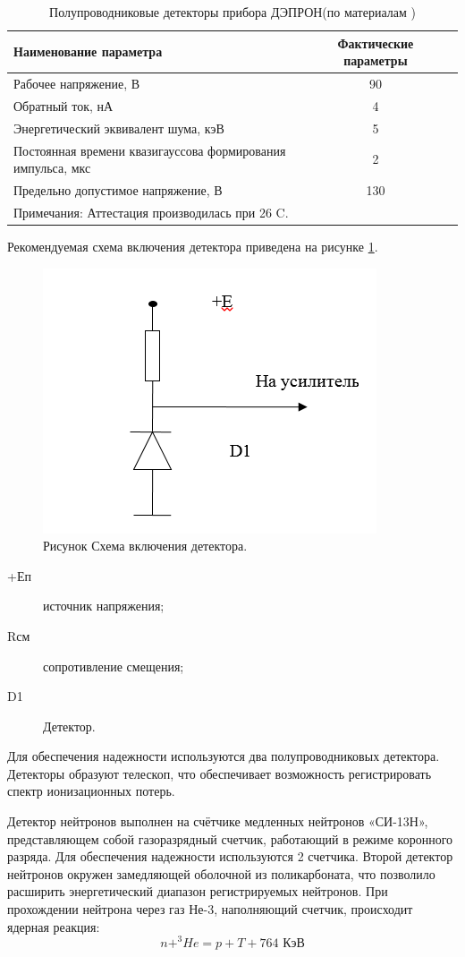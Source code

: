 \begin{table} 

	\begin{tabular}{p{10cm}|cc}
		Наименование параметра&Фактические параметры\\ \hline
		Рабочее напряжение, В&90&\\ Обратный ток, нА&4\\
		Энергетический эквивалент шума, кэВ&5\\
		Постоянная времени квазигауссова формирования импульса, мкс&2\\
		Предельно допустимое напряжение, В&130\\
		\multicolumn{2}{l}{Примечания: Аттестация производилась при 26 C.}\\
		
	\end{tabular} 
	\caption{Полупроводниковые детекторы прибора ДЭПРОН(по материалам )}
		\label{tab:detectors}
\end{table}
\todo{}

Рекомендуемая схема включения детектора приведена на рисунке \ref{fig:detector_sch}. 

\begin{figure}[h]
\centering
\includegraphics[width=0.5\linewidth]{images/detector_sch}
\caption{Рисунок Схема включения детектора.}
\label{fig:detector_sch}
\end{figure}
\begin{description}
	\item[+Еп] источник напряжения;
	\item[Rсм] сопротивление смещения;
	\item[D1] Детектор.
\end{description}


Для обеспечения надежности используются два полупроводниковых детектора. Детекторы образуют телескоп, что обеспечивает возможность регистрировать спектр ионизационных потерь.

Детектор нейтронов выполнен на счётчике медленных нейтронов «СИ-13Н», представляющем собой газоразрядный  счетчик, работающий в режиме коронного разряда. Для обеспечения надежности используются 2 счетчика. Второй детектор нейтронов окружен замедляющей оболочной из поликарбоната, что позволило расширить энергетический диапазон регистрируемых нейтронов. При прохождении нейтрона через газ Не-3, наполняющий счетчик, происходит ядерная реакция:
\[ n+^3\!He = p+T+764 \textrm{ КэВ}\]

